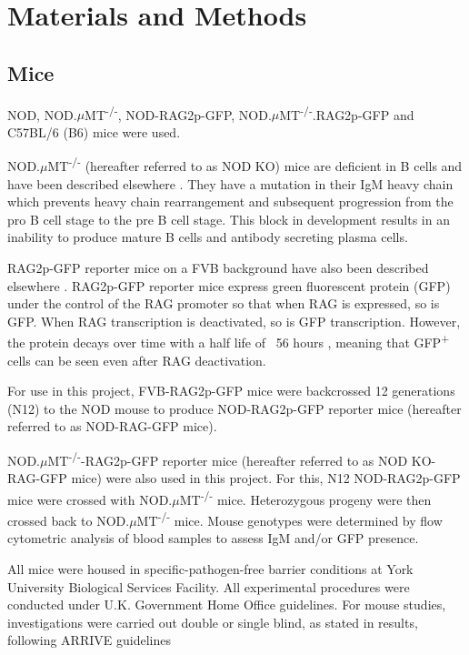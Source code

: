 
\chapter{Materials and Methods}



\section{Mice}
\label{methods:mice}

NOD, NOD.$\mu$MT\textsuperscript{-/-}, NOD-RAG2p-GFP, NOD.$\mu$MT\textsuperscript{-/-}.RAG2p-GFP and C57BL/6 (B6) mice were used.

NOD.$\mu$MT\textsuperscript{-/-} (hereafter referred to as NOD KO) mice are deficient in B cells and have been described elsewhere \citep{Serreze1996}.
They have a mutation in their IgM heavy chain which prevents heavy chain rearrangement and subsequent progression from the pro B cell stage to the pre B cell stage.
This block in development results in an inability to produce mature B cells and antibody secreting plasma cells.

RAG2p-GFP reporter mice on a FVB background have also been described elsewhere \citep{Yu1999}.
RAG2p-GFP reporter mice express green fluorescent protein (GFP) under the control of the RAG promoter so that when RAG is expressed, so is GFP.
When RAG transcription is deactivated, so is GFP transcription.
However, the protein decays over time with a half life of ~56 hours \citep{McCaughtry2007}, meaning that GFP\textsuperscript{+} cells can be seen even after RAG deactivation.

For use in this project, FVB-RAG2p-GFP mice were backcrossed 12 generations (N12) to the NOD mouse to produce NOD-RAG2p-GFP reporter mice (hereafter referred to as NOD-RAG-GFP mice).

NOD.$\mu$MT\textsuperscript{-/-}-RAG2p-GFP reporter mice (hereafter referred to as NOD KO-RAG-GFP mice) were also used in this project.
For this, N12 NOD-RAG2p-GFP mice were crossed with NOD.$\mu$MT\textsuperscript{-/-} mice.
Heterozygous progeny were then crossed back to NOD.$\mu$MT\textsuperscript{-/-} mice.
Mouse genotypes were determined by flow cytometric analysis of blood samples to assess IgM and/or GFP presence.

All mice were housed in specific-pathogen-free barrier conditions at York University Biological Services Facility. 
All experimental procedures were conducted under U.K. Government Home Office guidelines.
For mouse studies, investigations were carried out double or single blind, as stated in results, following ARRIVE guidelines \citep{Arriveguidelines}


